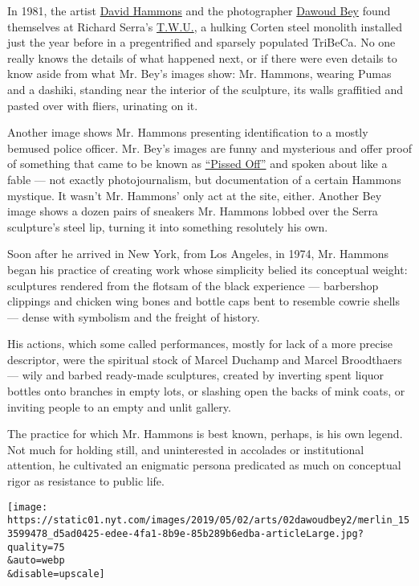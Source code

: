 In 1981, the artist
\href{http://www.mnuchingallery.com/artists/david-hammons}{David
Hammons} and the photographer
\href{https://www.nytimes.com/2018/12/24/lens/dawoud-bey-seeing-deeply.html}{Dawoud
Bey} found themselves at Richard Serra's
\href{https://www.publicartfund.org/view/exhibitions/5865_twu}{T.W.U.},
a hulking Corten steel monolith installed just the year before in a
pregentrified and sparsely populated TriBeCa. No one really knows the
details of what happened next, or if there were even details to know
aside from what Mr. Bey's images show: Mr. Hammons, wearing Pumas and a
dashiki, standing near the interior of the sculpture, its walls
graffitied and pasted over with fliers, urinating on it.

Another image shows Mr. Hammons presenting identification to a mostly
bemused police officer. Mr. Bey's images are funny and mysterious and
offer proof of something that came to be known as
\href{http://www.thegreatgodpanisdead.com/2013/08/art-out-in-world-jim-nolans-shifting.html}{``Pissed
Off''} and spoken about like a fable --- not exactly photojournalism,
but documentation of a certain Hammons mystique. It wasn't Mr. Hammons'
only act at the site, either. Another Bey image shows a dozen pairs of
sneakers Mr. Hammons lobbed over the Serra sculpture's steel lip,
turning it into something resolutely his own.

Soon after he arrived in New York, from Los Angeles, in 1974, Mr.
Hammons began his practice of creating work whose simplicity belied its
conceptual weight: sculptures rendered from the flotsam of the black
experience --- barbershop clippings and chicken wing bones and bottle
caps bent to resemble cowrie shells --- dense with symbolism and the
freight of history.

His actions, which some called performances, mostly for lack of a more
precise descriptor, were the spiritual stock of Marcel Duchamp and
Marcel Broodthaers --- wily and barbed ready-made sculptures, created by
inverting spent liquor bottles onto branches in empty lots, or slashing
open the backs of mink coats, or inviting people to an empty and unlit
gallery.

The practice for which Mr. Hammons is best known, perhaps, is his own
legend. Not much for holding still, and uninterested in accolades or
institutional attention, he cultivated an enigmatic persona predicated
as much on conceptual rigor as resistance to public life.

\texttt{[image: https://static01.nyt.com/images/2019/05/02/arts/02dawoudbey2/merlin\_153599478\_d5ad0425-edee-4fa1-8b9e-85b289b6edba-articleLarge.jpg?quality=75\\\&auto=webp\\\&disable=upscale]}

